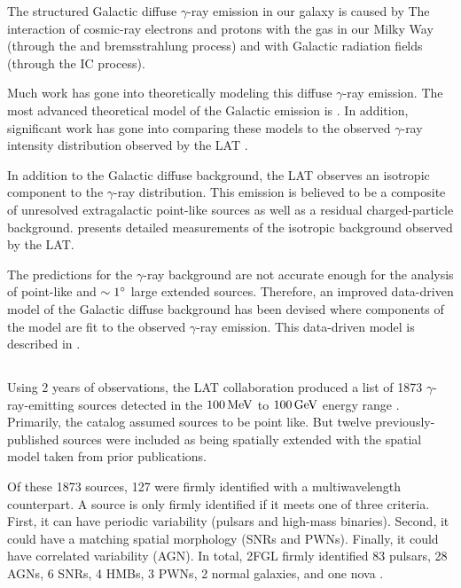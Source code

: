 The structured Galactic diffuse $\gamma$-ray emission in our galaxy is
caused by The interaction of cosmic-ray electrons and protons with the
gas in our Milky Way (through the \pion and bremsstrahlung process)
and with Galactic radiation fields (through the \ac{IC} process).

Much work has gone into theoretically modeling this
diffuse $\gamma$-ray emission. The most advanced
theoretical model of the Galactic emission is \galprop
\citep{strong_1998a_propagation-cosmic-ray,moskalenko_2000a_anisotropic-inverse}.
In addition, significant work has gone into comparing these
models to the observed $\gamma$-ray intensity
distribution observed by the \ac{LAT} \citep{abdo_2009a_fermi-large,
ackermann_2012a_fermi-lat-observations}.

In addition to the Galactic diffuse background, the \ac{LAT}
observes an isotropic component to the $\gamma$-ray distribution.
This emission is believed to be a composite of unresolved extragalactic
point-like sources as well as a residual charged-particle background.
\cite{abdo_2010a_spectrum-isotropic} presents detailed measurements of
the isotropic background observed by the \ac{LAT}.

The \galprop predictions for the $\gamma$-ray background are not
accurate enough for the analysis of point-like and $\sim1^\circ$
large extended sources.  Therefore, an improved data-driven model
of the Galactic diffuse background has been devised where components
of the \galprop model are fit to the observed $\gamma$-ray emission.
This data-driven model is described in \cite{nolan_2012_fermi-large}.


\subsection{}

Using 2 years of observations, the \ac{LAT} collaboration produced a list
of 1873 $\gamma$-ray-emitting sources detected in the $100\,\text{MeV}$
to $100\,\text{GeV}$ energy range \citep{nolan_2012_fermi-large}.
Primarily, the catalog assumed sources to be point like. But twelve
previously-published sources were included as being spatially extended
with the spatial model taken from prior publications.

Of these 1873 sources, 127 were firmly identified with a multiwavelength
counterpart.  A source is only firmly identified if it meets one of
three criteria. First, it can have periodic variability (pulsars and
high-mass binaries).  Second, it could have a matching spatial morphology
(\acp{SNR} and \acp{PWN}). Finally, it could have correlated variability
(\ac{AGN}).  In total, \ac{2FGL} firmly identified 83 pulsars, 28
\acp{AGN}, 6 \acp{SNR}, 4 \acp{HMB}, 3 \acp{PWN}, 2 normal galaxies,
and one nova \cite{nolan_2012_fermi-large}.

